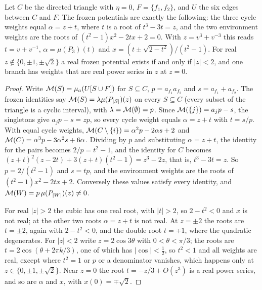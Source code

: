 \begin{theorem}\label{thm:triangle-solved}
Let $C$ be the directed triangle with $\eta=0$, $F=\{f_1,f_2\}$, and $U$ the six edges between $C$ and $F$. The frozen potentials are exactly the following: the three cycle weights equal $\alpha=z+t$, where $t$ is a root of $t^{3}-3t=z$, and the two environment weights are the roots of $(t^{2}-1)x^{2}-2tx+2=0$. With $z=v^{3}+v^{-3}$ this reads $t=v+v^{-1}$, $\alpha=\mu(P_3)(t)$ and $x=(t\pm\sqrt{2-t^{2}})/(t^{2}-1)$. For real $z\notin\{0,\pm1,\pm\sqrt2\}$ a real frozen potential exists if and only if $|z|<2$, and one branch has weights that are real power series in $z$ at $z=0$.
\end{theorem}
\begin{proof}
Write $\mathcal{M}(S)=\mu_a(U[S\cup F])$ for $S\subseteq C$, $p=a_{f_1}a_{f_2}$ and $s=a_{f_1}+a_{f_2}$. The frozen identities say $\mathcal{M}(S)=\lambda\mu(P_{|S|})(z)$ on every $S\subseteq C$ (every subset of the triangle is a cyclic interval), with $\lambda=\mathcal{M}(\emptyset)=p$. Since $\mathcal{M}(\{j\})=a_jp-s$, the singletons give $a_jp-s=zp$, so every cycle weight equals $\alpha=z+t$ with $t=s/p$. With equal cycle weights, $\mathcal{M}(C\setminus\{i\})=\alpha^{2}p-2\alpha s+2$ and $\mathcal{M}(C)=\alpha^{3}p-3\alpha^{2}s+6\alpha$. Dividing by $p$ and substituting $\alpha=z+t$, the identity for the pairs becomes $2/p=t^{2}-1$, and the identity for $C$ becomes $(z+t)^{2}(z-2t)+3(z+t)(t^{2}-1)=z^{3}-2z$, that is, $t^{3}-3t=z$. So $p=2/(t^{2}-1)$ and $s=tp$, and the environment weights are the roots of $(t^{2}-1)x^{2}-2tx+2$. Conversely these values satisfy every identity, and $\mathcal{M}(W)=p\,\mu(P_{|W|})(z)\neq0$.

For real $|z|>2$ the cubic has one real root, with $|t|>2$, so $2-t^{2}<0$ and $x$ is not real; at the other two roots $\alpha=z+t$ is not real. At $z=\pm2$ the roots are $t=\pm2$, again with $2-t^2<0$, and the double root $t=\mp1$, where the quadratic degenerates. For $|z|<2$ write $z=2\cos3\theta$ with $0<\theta<\pi/3$; the roots are $t=2\cos(\theta+2\pi k/3)$, one of which has $|\cos|<\frac12$, so $t^{2}<1$ and all weights are real, except where $t^2=1$ or $p$ or a denominator vanishes, which happens only at $z\in\{0,\pm1,\pm\sqrt2\}$. Near $z=0$ the root $t=-z/3+O(z^{3})$ is a real power series, and so are $\alpha$ and $x$, with $x(0)=\mp\sqrt2$.
\end{proof}

